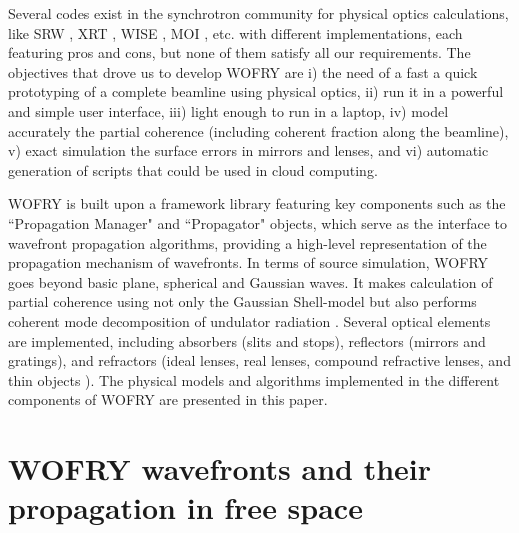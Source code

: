 \documentclass{iopconfser}
\begin{document}
Several codes exist in the synchrotron community for physical optics calculations, like SRW \citep{codeSRW}, XRT \citep{XRT}, WISE \citep{wise}, MOI \citep{MOI}, etc. with different implementations, each featuring pros and cons, but none of them satisfy all our requirements. The objectives that drove us to develop WOFRY are i) the need of a fast a quick prototyping of a complete beamline using physical optics, ii) run it in a powerful and simple user interface, iii) light enough to run in a laptop, iv) model accurately the partial coherence (including coherent fraction along the beamline), v) exact simulation the surface errors in mirrors and lenses, and vi) automatic generation of scripts that could be used in cloud computing.    

WOFRY is built upon a framework library \citep{syned} featuring key components such as the ``Propagation Manager" and ``Propagator" objects, which serve as the interface to wavefront propagation algorithms, providing a high-level representation of the propagation mechanism of wavefronts.
In terms of source simulation, WOFRY goes beyond basic plane, spherical and Gaussian waves. It makes calculation of partial coherence using not only the Gaussian Shell-model but also performs coherent mode decomposition of undulator radiation \citep{SanchezdelRio2022CMD}.
Several optical elements are implemented, including absorbers (slits and stops), reflectors (mirrors and gratings), and refractors (ideal lenses, real lenses, compound refractive lenses, and thin objects \citep{Celestre2019}). The physical models and algorithms implemented in the different components of WOFRY are presented in this paper. 







\section{WOFRY wavefronts and their propagation in free space}

\end{document}
